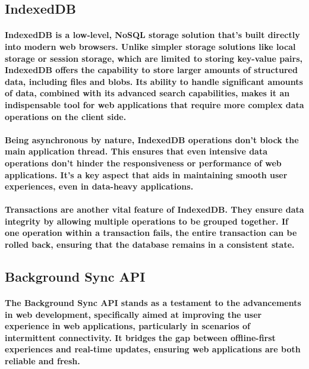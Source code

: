 \documentclass[12pt,a4paper]{article}
\begin{document}
    \subsection{IndexedDB}

    \paragraph{IndexedDB is a low-level, NoSQL storage solution that’s built directly into modern web browsers. Unlike simpler storage solutions like local storage or session storage, which are limited to storing key-value pairs, IndexedDB offers the capability to store larger amounts of structured data, including files and blobs. Its ability to handle significant amounts of data, combined with its advanced search capabilities, makes it an indispensable tool for web applications that require more complex data operations on the client side.}
    
    \paragraph{Being asynchronous by nature, IndexedDB operations don’t block the main application thread. This ensures that even intensive data operations don’t hinder the responsiveness or performance of web applications. It’s a key aspect that aids in maintaining smooth user experiences, even in data-heavy applications.}
    
    \paragraph{Transactions are another vital feature of IndexedDB. They ensure data integrity by allowing multiple operations to be grouped together. If one operation within a transaction fails, the entire transaction can be rolled back, ensuring that the database remains in a consistent state.}

    \subsection{Background Sync API}

    \paragraph{The Background Sync API stands as a testament to the advancements in web development, specifically aimed at improving the user experience in web applications, particularly in scenarios of intermittent connectivity. It bridges the gap between offline-first experiences and real-time updates, ensuring web applications are both reliable and fresh.}
    
\end{document}
